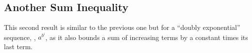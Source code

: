 \documentclass[12pt]{colt2018} %
\begin{document}




\subsection{Another Sum Inequality}

This second result is similar to the previous one but for a ``doubly exponential'' sequence, \ie, $a^{b^i}$,
as it also bounds a sum of increasing terms by a constant times its last term.
\end{document}
